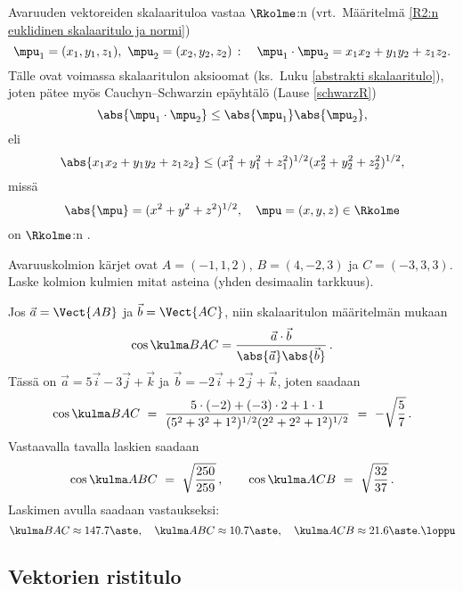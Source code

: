 Avaruuden vektoreiden skalaarituloa vastaa $\Rkolme$:n
(vrt.\ Määritelmä \ref{R2:n euklidinen skalaaritulo ja normi})
\[
\mpu_1 = (x_1,y_1,z_1), \ \mpu_2 = (x_2,y_2,z_2)\,: \quad
                                    \mpu_1 \cdot \mpu_2 = x_1x_2 + y_1y_2 + z_1z_2.
\]
Tälle ovat voimassa skalaaritulon aksioomat (ks.\ Luku \ref{abstrakti skalaaritulo}), joten
pätee myös Cauchyn--Schwarzin epäyhtälö (Lause \ref{schwarzR})
\[
\abs{\mpu_1\cdot\mpu_2} \le \abs{\mpu_1}\abs{\mpu_2},
\]
eli
\[
\abs{x_1x_2 + y_1y_2 + z_1z_2} \leq (x_1^2+y_1^2+z_1^2)^{1/2}(x_2^2+y_2^2+z_2^2)^{1/2},
\]
missä
\[
\abs{\mpu}=(x^2+y^2+z^2)^{1/2}, \quad \mpu=(x,y,z)\in\Rkolme
\]
on $\Rkolme$:n
.
\begin{Exa} Avaruuskolmion kärjet ovat $A=(-1,1,2)$, $B=(4,-2,3)$ ja $C=(-3,3,3)$. Laske kolmion
kulmien mitat asteina (yhden desimaalin tarkkuus).
\end{Exa}
\ratk Jos $\vec a=\Vect{AB}$ ja $\vec b=\Vect{AC}$, niin skalaaritulon määritelmän mukaan
\[
\cos\kulma BAC = \frac{\vec a\cdot\vec b}{\abs{\vec a}\abs{\vec b}}\,.
\]
Tässä on $\vec a=5\vec i-3\vec j+\vec k$ ja $\vec b=-2\vec i+2\vec j+\vec k$, joten saadaan
\[
\cos\kulma BAC\ 
  =\ \frac{5 \cdot (-2) + (-3) \cdot 2 +1 \cdot 1}{(5^2+3^2+1^2)^{1/2}(2^2+2^2+1^2)^{1/2}}\
  =\ -\sqrt{\frac{5}{7}}\,.
\]
Vastaavalla tavalla laskien saadaan
\[
\cos\kulma ABC\ =\ \sqrt{\frac{250}{259}}\,, \qquad
\cos\kulma ACB\ =\ \sqrt{\frac{32}{37}}\,.
\]
Laskimen avulla saadaan vastaukseksi: 
\[
\kulma BAC \approx 147.7\aste, \quad \kulma ABC \approx 10.7\aste, \quad
\kulma ACB \approx 21.6\aste. \loppu
\]

\subsection{Vektorien ristitulo}

